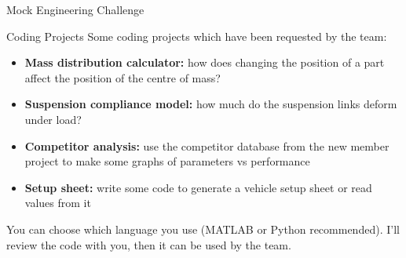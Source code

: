 \begin{frame}{Mock Engineering Challenge}

\end{frame}

\begin{frame}{Coding Projects}
    Some coding projects which have been requested by the team:
    \begin{itemize}
        \item \textbf{Mass distribution calculator:}
        how does changing the position of a part
        affect the position of the centre of mass?
        \item \textbf{Suspension compliance model:}
        how much do the suspension links deform under load?
        \item \textbf{Competitor analysis:}
        use the competitor database from the new member project
        to make some graphs of parameters vs performance
        \item \textbf{Setup sheet:}
        write some code to generate a vehicle setup sheet
        or read values from it
    \end{itemize}
    You can choose which language you use
    (MATLAB or Python recommended).
    I'll review the code with you,
    then it can be used by the team.
\end{frame}